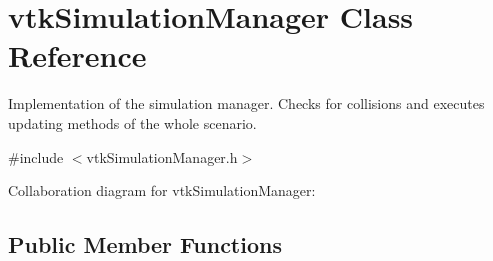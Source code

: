 \hypertarget{classvtkSimulationManager}{
\section{vtkSimulationManager Class Reference}
\label{classvtkSimulationManager}
}


Implementation of the simulation manager. Checks for collisions and executes updating methods of the whole scenario.  




{\ttfamily \#include $<$vtkSimulationManager.h$>$}



Collaboration diagram for vtkSimulationManager:\subsection*{Public Member Functions}
